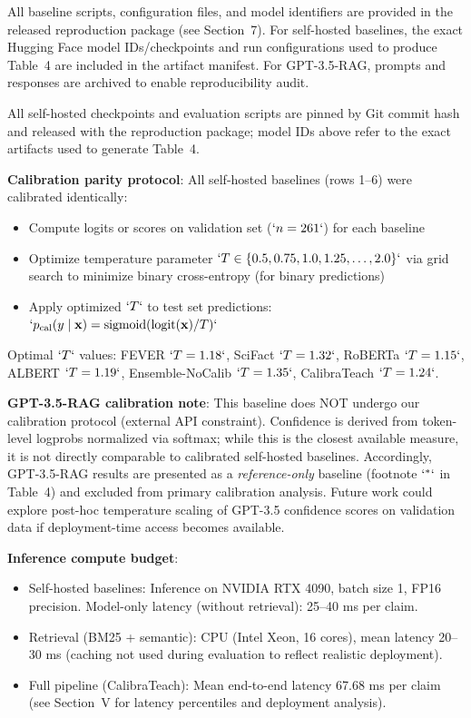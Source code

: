 All baseline scripts, configuration files, and model identifiers are provided in the released reproduction package (see Section~7). For self-hosted baselines, the exact Hugging Face model IDs/checkpoints and run configurations used to produce Table~4 are included in the artifact manifest. For GPT-3.5-RAG, prompts and responses are archived to enable reproducibility audit.

All self-hosted checkpoints and evaluation scripts are pinned by Git commit hash and released with the reproduction package; model IDs above refer to the exact artifacts used to generate Table~4.

\textbf{Calibration parity protocol}: All self-hosted baselines (rows 1--6) were calibrated identically:

\begin{itemize}
\item
  Compute logits or scores on validation set (\(`n=261`\)) for each baseline
\item
  Optimize temperature parameter \(`T \in \{0.5, 0.75, 1.0, 1.25, \ldots, 2.0\}`\) via grid search to minimize binary cross-entropy (for binary predictions)
\item
  Apply optimized \(`T`\) to test set predictions: \(`p_{\text{cal}}(y \mid \mathbf{x}) = \text{sigmoid}(\text{logit}(\mathbf{x}) / T)`\)
\end{itemize}

Optimal \(`T`\) values: FEVER \(`T=1.18`\), SciFact \(`T=1.32`\), RoBERTa \(`T=1.15`\), ALBERT \(`T=1.19`\), Ensemble-NoCalib \(`T=1.35`\), CalibraTeach \(`T=1.24`\).

\textbf{GPT-3.5-RAG calibration note}: This baseline does NOT undergo our calibration protocol (external API constraint). Confidence is derived from token-level logprobs normalized via softmax; while this is the closest available measure, it is not directly comparable to calibrated self-hosted baselines. Accordingly, GPT-3.5-RAG results are presented as a \emph{reference-only} baseline (footnote \(`^{*}`\) in Table~4) and excluded from primary calibration analysis. Future work could explore post-hoc temperature scaling of GPT-3.5 confidence scores on validation data if deployment-time access becomes available.

\textbf{Inference compute budget}:

\begin{itemize}
\item
  Self-hosted baselines: Inference on NVIDIA RTX 4090, batch size 1, FP16 precision. Model-only latency (without retrieval): 25--40 ms per claim.
\item
  Retrieval (BM25 + semantic): CPU (Intel Xeon, 16 cores), mean latency 20--30 ms (caching not used during evaluation to reflect realistic deployment).
\item
  Full pipeline (CalibraTeach): Mean end-to-end latency 67.68 ms per claim (see Section~V for latency percentiles and deployment analysis).
\end{itemize}

